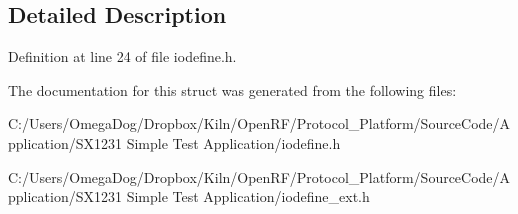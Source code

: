 \subsection{Detailed Description}


Definition at line 24 of file iodefine.\-h.



The documentation for this struct was generated from the following files\-:\begin{DoxyCompactItemize}
\item 
C\-:/\-Users/\-Omega\-Dog/\-Dropbox/\-Kiln/\-Open\-R\-F/\-Protocol\-\_\-\-Platform/\-Source\-Code/\-Application/\-S\-X1231 Simple Test Application/iodefine.\-h\item 
C\-:/\-Users/\-Omega\-Dog/\-Dropbox/\-Kiln/\-Open\-R\-F/\-Protocol\-\_\-\-Platform/\-Source\-Code/\-Application/\-S\-X1231 Simple Test Application/iodefine\-\_\-ext.\-h\end{DoxyCompactItemize}
